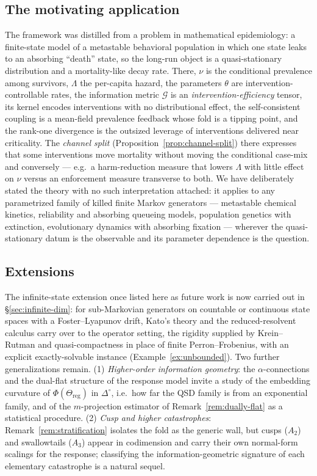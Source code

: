 \documentclass[11pt,reqno]{amsart}
\theoremstyle{plain}
\theoremstyle{definition}
\theoremstyle{remark}
\newcommand{\Reg}{\Theta_{\mathrm{reg}}}
\newcommand{\Simp}{\Delta^{\!\circ}}
\begin{document}
\subsection{The motivating application}\label{sec:applications}
The framework was distilled from a problem in mathematical epidemiology: a
finite-state model of a metastable behavioral population in which one state leaks
to an absorbing ``death'' state, so the long-run object is a quasi-stationary
distribution and a mortality-like decay rate. There, $\nu$ is the conditional
prevalence among survivors, $\Lambda$ the per-capita hazard, the parameters
$\theta$ are intervention-controllable rates, the information metric $\mathcal G$ is
an \emph{intervention-efficiency} tensor, its kernel encodes interventions with no
distributional effect, the self-consistent coupling is a mean-field prevalence
feedback whose fold is a tipping point, and the rank-one divergence is the outsized
leverage of interventions delivered near criticality. The \emph{channel split}
(Proposition~\ref{prop:channel-split}) there expresses that some interventions move
mortality without moving the conditional case-mix and conversely --- e.g.\ a
harm-reduction measure that lowers $\Lambda$ with little effect on $\nu$ versus an
enforcement measure transverse to both. We have deliberately stated the theory
with no such interpretation attached: it applies to any parametrized family of
killed finite Markov generators --- metastable chemical kinetics, reliability and
absorbing queueing models, population genetics with extinction, evolutionary
dynamics with absorbing fixation --- wherever the quasi-stationary datum is the
observable and its parameter dependence is the question.

\subsection{Extensions}
The infinite-state extension once listed here as future work is now carried out in
\S\ref{sec:infinite-dim}: for sub-Markovian generators on countable or continuous
state spaces with a Foster--Lyapunov drift, Kato's theory and the reduced-resolvent
calculus carry over to the operator setting, the rigidity supplied by Krein--Rutman
and quasi-compactness in place of finite Perron--Frobenius, with an explicit
exactly-solvable instance (Example~\ref{ex:unbounded}). Two further generalizations
remain. (1) \emph{Higher-order
information geometry}: the $\alpha$-connections and the dual-flat structure of the
response model invite a study of the embedding curvature of $\Phi(\Reg)$ in
$\Simp$, i.e.\ how far the QSD family is from an exponential family, and of the
$m$-projection estimator of Remark~\ref{rem:dually-flat} as a statistical
procedure. (2) \emph{Cusp and higher catastrophes}: Remark~\ref{rem:stratification}
isolates the fold as the generic wall, but cusps ($A_2$) and swallowtails ($A_3$)
appear in codimension and carry their own normal-form scalings for the response;
classifying the information-geometric signature of each elementary catastrophe is a
natural sequel.
\end{document}
